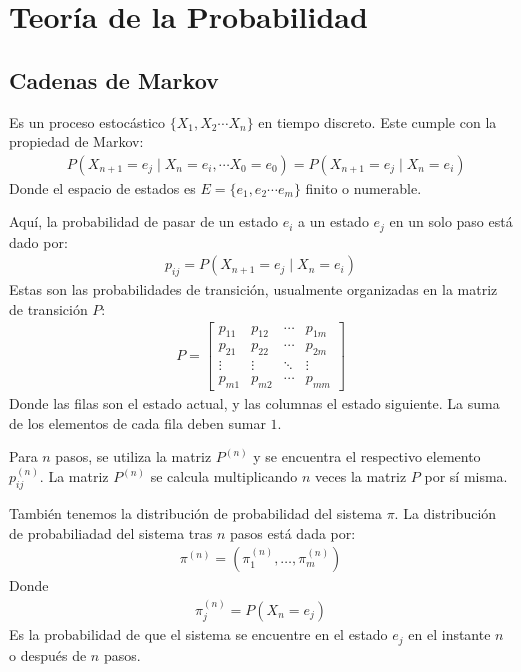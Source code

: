\section{Teoría de la Probabilidad}

\subsection{Cadenas de Markov}

Es un proceso estocástico $\{X_1, X_2 \cdots X_n\}$ en tiempo discreto. Este cumple con la propiedad de Markov:
\begin{align*}
    &P(X_{n+1} = e_j \mid X_n = e_i, \cdots X_0 = e_{0}) = P(X_{n+1} = e_j \mid X_n = e_i)
\end{align*}
Donde el espacio de estados es $E = \{e_1, e_2\cdots e_m\}$ finito o numerable.

Aquí, la probabilidad de pasar de un estado $e_i$ a un estado $e_j$ en un solo paso está dado por:
\begin{align*}
    p_{ij} = P(X_{n+1} = e_j \mid X_n = e_i)
\end{align*}
Estas son las probabilidades de transición, usualmente organizadas en la matriz de transición $P$:
\begin{align*}
    P = \begin{bmatrix}
        p_{11} & p_{12} & \cdots & p_{1m}\\
        p_{21} & p_{22} & \cdots & p_{2m}\\
        \vdots & \vdots & \ddots & \vdots\\
        p_{m1} & p_{m2} & \cdots & p_{mm}
    \end{bmatrix}
\end{align*}
Donde las filas son el estado actual, y las columnas el estado siguiente. La suma de los elementos de cada fila deben sumar $1$.

Para $n$ pasos, se utiliza la matriz $P^{(n)}$ y se encuentra el respectivo elemento $p^{(n)}_{ij}$. La matriz $P^{(n)}$ se calcula multiplicando $n$ veces la matriz $P$ por sí misma.

También tenemos la distribución de probabilidad del sistema $\pi$. La distribución de probabiliadad del sistema tras $n$ pasos está dada por:
\begin{align*}
    \pi^{(n)} = (\pi^{(n)}_1,\ldots,\pi^{(n)}_m)
\end{align*}
Donde 
\begin{align*}
    \pi^{(n)}_j = P(X_n = e_j)
\end{align*}
Es la probabilidad de que el sistema se encuentre en el estado $e_j$ en el instante $n$ o después de $n$ pasos.


